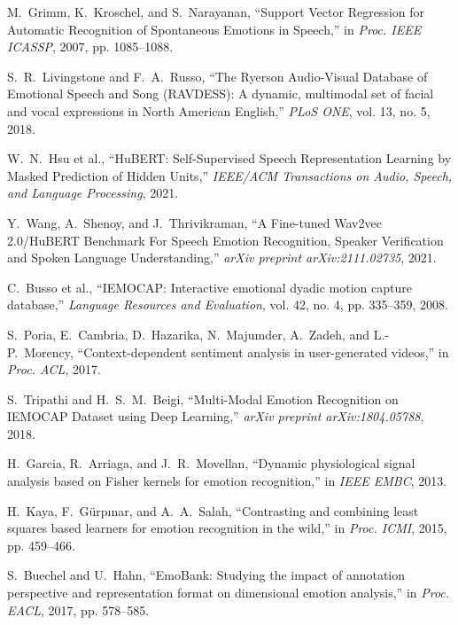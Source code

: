 \documentclass[conference]{IEEEtran}
\begin{document}
\begin{thebibliography}{00}
M.~Grimm, K.~Kroschel, and S.~Narayanan,
``Support Vector Regression for Automatic Recognition of Spontaneous Emotions in Speech,''
in \emph{Proc. IEEE ICASSP}, 2007, pp. 1085--1088.

S.~R.~Livingstone and F.~A.~Russo,
``The Ryerson Audio-Visual Database of Emotional Speech and Song (RAVDESS): A dynamic, multimodal set of facial and vocal expressions in North American English,''
\emph{PLoS ONE}, vol. 13, no. 5, 2018.

W.~N.~Hsu et al.,
``HuBERT: Self-Supervised Speech Representation Learning by Masked Prediction of Hidden Units,''
\emph{IEEE/ACM Transactions on Audio, Speech, and Language Processing}, 2021.

Y.~Wang, A.~Shenoy, and J.~Thrivikraman,
``A Fine-tuned Wav2vec 2.0/HuBERT Benchmark For Speech Emotion Recognition, Speaker Verification and Spoken Language Understanding,''
\emph{arXiv preprint arXiv:2111.02735}, 2021.

C.~Busso et al.,
``IEMOCAP: Interactive emotional dyadic motion capture database,''
\emph{Language Resources and Evaluation}, vol. 42, no. 4, pp. 335--359, 2008.

S.~Poria, E.~Cambria, D.~Hazarika, N.~Majumder, A.~Zadeh, and L.-P.~Morency,
``Context-dependent sentiment analysis in user-generated videos,''
in \emph{Proc. ACL}, 2017.

S.~Tripathi and H.~S.~M.~Beigi,
``Multi-Modal Emotion Recognition on IEMOCAP Dataset using Deep Learning,''
\emph{arXiv preprint arXiv:1804.05788}, 2018.

H.~Garcia, R.~Arriaga, and J.~R.~Movellan,
``Dynamic physiological signal analysis based on Fisher kernels for emotion recognition,''
in \emph{IEEE EMBC}, 2013.

H.~Kaya, F.~Gürpınar, and A.~A.~Salah,
``Contrasting and combining least squares based learners for emotion recognition in the wild,''
in \emph{Proc. ICMI}, 2015, pp. 459--466.

S.~Buechel and U.~Hahn,
``EmoBank: Studying the impact of annotation perspective and representation format on dimensional emotion analysis,''
in \emph{Proc. EACL}, 2017, pp. 578--585.


\end{thebibliography}
\end{document}
